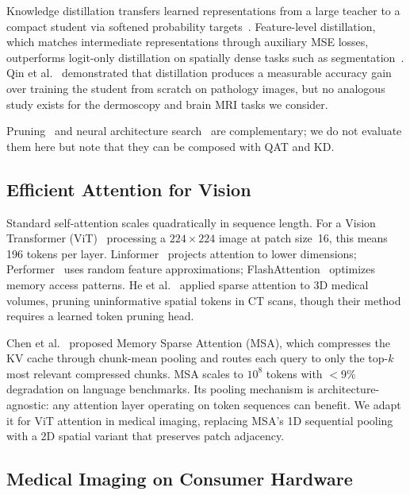 \documentclass[10pt,twocolumn]{article}
\begin{document}
Knowledge distillation transfers learned representations from a large teacher to a compact student via softened probability targets~\citep{hinton2015distilling}. Feature-level distillation, which matches intermediate representations through auxiliary MSE losses, outperforms logit-only distillation on spatially dense tasks such as segmentation~\citep{romero2015fitnets}. Qin et al.~\citep{qin2023efficient} demonstrated that distillation produces a measurable accuracy gain over training the student from scratch on pathology images, but no analogous study exists for the dermoscopy and brain MRI tasks we consider.

Pruning~\citep{han2015learning} and neural architecture search~\citep{choudhary2020comprehensive} are complementary; we do not evaluate them here but note that they can be composed with QAT and KD.

\subsection{Efficient Attention for Vision}

Standard self-attention scales quadratically in sequence length. For a Vision Transformer (ViT)~\citep{dosovitskiy2021image} processing a $224{\times}224$ image at patch size~16, this means 196 tokens per layer. Linformer~\citep{wang2020linformer} projects attention to lower dimensions; Performer~\citep{choromanski2021performers} uses random feature approximations; FlashAttention~\citep{dao2022flashattention} optimizes memory access patterns. He et al.~\citep{he2024sparse} applied sparse attention to 3D medical volumes, pruning uninformative spatial tokens in CT scans, though their method requires a learned token pruning head.

Chen et al.~\citep{chen2026msa} proposed Memory Sparse Attention (MSA), which compresses the KV cache through chunk-mean pooling and routes each query to only the top-$k$ most relevant compressed chunks. MSA scales to $10^8$ tokens with $<$9\% degradation on language benchmarks. Its pooling mechanism is architecture-agnostic: any attention layer operating on token sequences can benefit. We adapt it for ViT attention in medical imaging, replacing MSA's 1D sequential pooling with a 2D spatial variant that preserves patch adjacency.

\subsection{Medical Imaging on Consumer Hardware}
\end{document}
